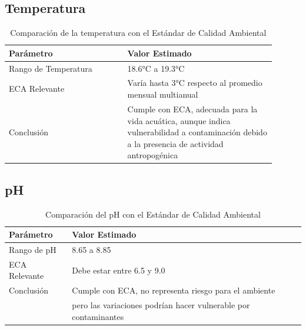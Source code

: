 \subsection*{Temperatura}

\begin{table}[H]
\centering
\caption{Comparación de la temperatura con el Estándar de Calidad Ambiental}
\begin{tabular}{p{0.4\linewidth} p{0.5\linewidth}}
\toprule
Parámetro & Valor Estimado \\
\midrule
Rango de Temperatura & 18.6°C a 19.3°C \\
ECA Relevante & Varía hasta 3°C respecto al promedio mensual multianual \\
Conclusión & Cumple con ECA, adecuada para la vida acuática, aunque indica vulnerabilidad a contaminación debido a la presencia de actividad antropogénica \\
\bottomrule
\end{tabular}
\end{table}


\subsection*{pH}

\begin{table}[H]
\centering
\caption{Comparación del pH  con el Estándar de Calidad Ambiental}
\begin{tabular}{ll}
\toprule
Parámetro & Valor Estimado \\
\midrule
Rango de pH & 8.65 a 8.85 \\
ECA Relevante & Debe estar entre 6.5 y 9.0 \\
Conclusión & Cumple con ECA, no representa riesgo para el ambiente  \\
& pero las variaciones podrían hacer vulnerable por contaminantes  \\
\bottomrule
\end{tabular}
\end{table}

